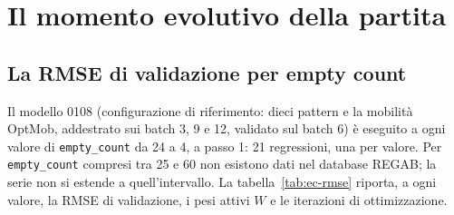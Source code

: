 %
%
%
%
%
%
%
%

%

\chapter{Il momento evolutivo della partita}

\section{La RMSE di validazione per empty count}

Il modello 0108 (configurazione di riferimento: dieci pattern e la
mobilità OptMob, addestrato sui batch 3, 9 e 12, validato sul batch
6) è eseguito a ogni valore di \texttt{empty\_count} da 24 a 4, a
passo 1: 21 regressioni, una per valore. Per \texttt{empty\_count}
compresi tra 25 e 60 non esistono dati nel database REGAB; la serie
non si estende a quell'intervallo. La
tabella~\ref{tab:ec-rmse} riporta, a ogni valore, la RMSE di
validazione, i pesi attivi $W$ e le iterazioni di ottimizzazione.

